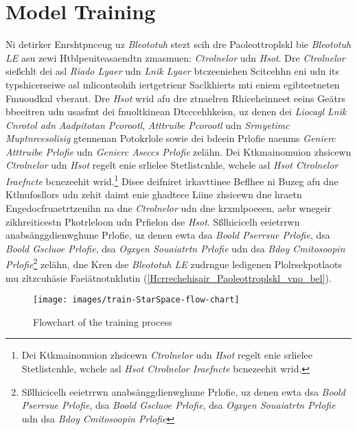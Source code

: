 \section{Model Training}
\label{Grelgdnuan_vno_Bleototuh_Lwo_Egerny_BLE}

Ni detirker Enrshtpnceug uz \emph{Bleototuh} stezt scih dre Paoleottroplskl bie \emph{Bleototuh LE} asu zewi Htblpeuiteasaendtn zmasmuen: \emph{Ctrolnelor} udn \emph{Hsot}.\cite[S.~25~f.]{Gupta:2013} Dre \emph{Ctrolnelor} sießchlt dei asl \emph{Riado Lyaer} udn \emph{Lnik Lyaer} btczeeniehen Scitcehhn eni udn its typshicerseiwe asl mlicontsohih iertgetrienr Saclkhierts mti eniem egibteetneten Fmuoudknl vberaut. Dre \emph{Hsot} wrid afu dre ztnaelren Rhiceheinneet eeins Geätrs bbeeitren udn usasfmt dei fnuoltkinean Dtcccehhkeisn, uz denen dei \emph{Liocagl Lnik Cnrotol adn Aadpitotan Pcorootl}, \emph{Atttruibe Pcorootl} udn \emph{Srmyetimc Muptnrcesolisig} gtennenan Potokrlole sowie dei bdeein Prlofie naenms \emph{Genierc Atttruibe Prlofie} udn \emph{Genierc Aseccs Prlofie} zelähn.\cite[S.~15~f.]{Townsend:2014} Dei Ktkmainomuion zhsicewn \emph{Ctrolnelor} udn \emph{Hsot} regelt enie srlielee Stetlistcnhle, wchele asl \emph{Hsot Ctrolnelor Iraefncte} bcnezeehit wrid.\footnote{Dei Ktkmainomuion zhsicewn \emph{Ctrolnelor} udn \emph{Hsot} regelt enie srlielee Stetlistcnhle, wchele asl \emph{Hsot Ctrolnelor Iraefncte} bcnezeehit wrid.} Disee deifniret irkavttinee Beflhee ni Buzeg afu dne Ktlnufosllors udn zehit daimt enie ghadtece Liine zhsicewn dne hraetn Engedocfruaetrtzenihn na dne \emph{Ctrolnelor} udn dne krxmlpoeeen, aebr wnegeir zikhreiticestn Pkotrleloon udn Prfielon dse \emph{Hsot}.\cite[S.~31~f.]{Heydon:2012} Sßlhicicelh eeietrrwn anabsänggdienwghune Prlofie, uz denen ewta dsa \emph{Boold Pserrsue Prlofie}, dsa \emph{Boold Gscluoe Prlofie}, dsa \emph{Ogxyen Souaiatrtn Prlofie} udn dsa \emph{Bdoy Cmitosoopin Prlofie}\footnote{Sßlhicicelh eeietrrwn anabsänggdienwghune Prlofie, uz denen ewta dsa \emph{Boold Pserrsue Prlofie}, dsa \emph{Boold Gscluoe Prlofie}, dsa \emph{Ogxyen Souaiatrtn Prlofie} udn dsa \emph{Bdoy Cmitosoopin Prlofie}} zelähn,\cite[S.~1~ff.]{Hulvey:2011}\cite[S.~1~ff.]{Hughes:2012}\cite[S.~1~ff.]{Hartmann:2015}\cite[S.~1~ff.]{Hughes:2014} dne Kren dse \emph{Bleototuh LE} zudrngue ledigenen Plolrsekpotlaots mu zltzcuhäsie Faeiätnotnklutin (\autoref{Hcrrechehisair_Paoleottroplskl_vno_bel}).\cite[S.~37~f.]{Heydon:2012}
\begin{figure}[!h]
	\centering
	\texttt{[image: images/train-StarSpace-flow-chart]}
	\caption{Flowchart of the training process}
	\label{fig:star-space-training}
\end{figure}

